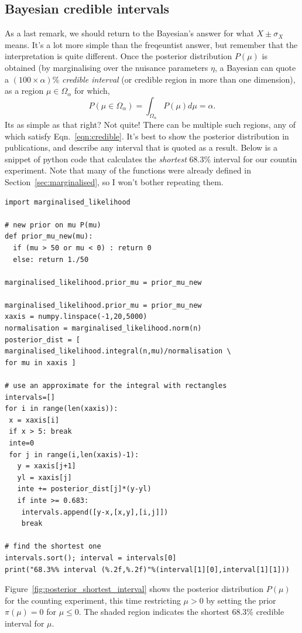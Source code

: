 \subsection{Bayesian credible intervals}
As a last remark, we should return to the Bayesian's answer for what $X\pm\sigma_{X}$ means. It's a lot more simple than the freqeuntist answer, but remember that the interpretation is quite different. Once the posterior distribution $P(\mu)$ is obtained (by marginalising over the nuisance parameters $\eta$, a Bayesian can quote a $(100\times\alpha)$\% \emph{credible interval} (or credible region in more than one dimension), as a region $\mu\in\Omega_{\alpha}$ for which,
\begin{equation}\label{eqn:credible}
    P(\mu\in\Omega_{\alpha})=\int_{\Omega_{\alpha}} P(\mu)d\mu = \alpha.
\end{equation}
Its as simple as that right? Not quite! There can be multiple such regions, any of which satisfy Eqn.~\ref{eqn:credible}. It's best to show the posterior distribution in publications, and describe any interval that is quoted as a result. Below is a snippet of python code that calculates the \emph{shortest} 68.3\% interval for our countin experiment. Note that many of the functions were already defined in Section~\ref{sec:marginalised}, so I won't bother repeating them.
\begin{lstlisting}[style = Python]
import marginalised_likelihood

# new prior on mu P(mu)
def prior_mu_new(mu):
  if (mu > 50 or mu < 0) : return 0
  else: return 1./50

marginalised_likelihood.prior_mu = prior_mu_new

marginalised_likelihood.prior_mu = prior_mu_new
xaxis = numpy.linspace(-1,20,5000)
normalisation = marginalised_likelihood.norm(n)
posterior_dist = [ marginalised_likelihood.integral(n,mu)/normalisation \
for mu in xaxis ]

# use an approximate for the integral with rectangles
intervals=[]
for i in range(len(xaxis)):
 x = xaxis[i]
 if x > 5: break
 inte=0
 for j in range(i,len(xaxis)-1):
   y = xaxis[j+1]
   yl = xaxis[j]
   inte += posterior_dist[j]*(y-yl)
   if inte >= 0.683:
    intervals.append([y-x,[x,y],[i,j]])
    break

# find the shortest one
intervals.sort(); interval = intervals[0]
print("68.3%% interval (%.2f,%.2f)"%(interval[1][0],interval[1][1]))
\end{lstlisting}

Figure~\ref{fig:posterior_shortest_interval} shows the posterior distribution $P(\mu)$ for the counting experiment, this time restricting $\mu>0$ by setting the prior $\pi(\mu)=0$ for $\mu\leq0$. The shaded region indicates the shortest 68.3\% credible interval for $\mu$. 

